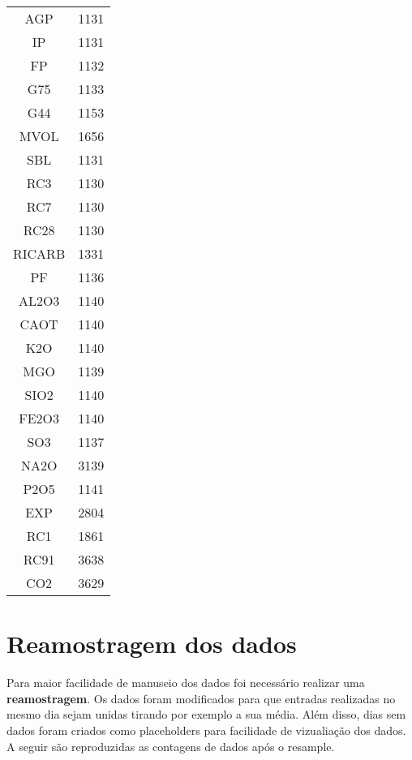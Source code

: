 \begin{center}
\begin{tabular}{ c c }
AGP     &  1131\\
IP      &  1131\\
FP      &  1132\\
G75    &  1133\\
G44   &  1153\\
MVOL    &  1656\\
SBL     &  1131\\
RC3     &  1130\\
RC7     &  1130\\
RC28    &  1130\\
RICARB  &  1331\\
PF      &  1136\\
AL2O3   &  1140\\
CAOT    &  1140\\
K2O     &  1140\\
MGO     &  1139\\
SIO2    &  1140\\
FE2O3   &  1140\\
SO3     &  1137\\
NA2O    &  3139\\
P2O5    &  1141\\
EXP     &  2804\\
RC1     &  1861\\
RC91    &  3638\\
CO2     &  3629 
\end{tabular}
\end{center}



\section{Reamostragem dos dados}
Para maior facilidade de manuseio dos dados foi necessário realizar uma
\textbf{reamostragem}. Os dados foram modificados para que entradas realizadas no
mesmo dia sejam unidas tirando por exemplo a sua média. Além disso, dias sem dados foram criados como placeholders para facilidade de vizualiação dos dados. A seguir são reproduzidas as contagens de dados após o resample.


